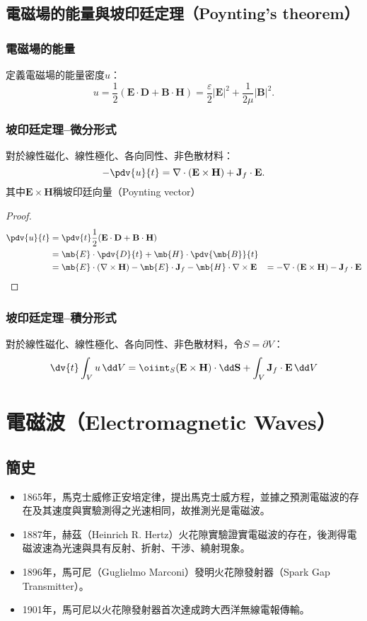 \documentclass[a4paper,12pt]{report}
\begin{document}
\begin{itemize}
\subsection{電磁場的能量與坡印廷定理（Poynting's theorem）}
\subsubsection{電磁場的能量}
定義電磁場的能量密度$u$：
\[u=\frac{1}{2}(\mathbf{E}\cdot\mathbf{D}+\mathbf{B}\cdot\mathbf{H})=\frac{\varepsilon}{2}|\mathbf{E}|^2+\frac{1}{2\mu}|\mathbf{B}|^2.\]
\subsubsection{坡印廷定理–微分形式}
對於線性磁化、線性極化、各向同性、非色散材料：
\[-\pdv{u}{t}=\nabla\cdot(\mathbf{E}\times\mathbf{H})+\mathbf{J}_f\cdot\mathbf{E}.\]
其中$\mathbf{E}\times\mathbf{H}$稱坡印廷向量（Poynting vector）
\begin{proof}
\[\begin{aligned}
\pdv{u}{t}&=\pdv{t}\frac{1}{2}(\mathbf{E}\cdot\mathbf{D}+\mathbf{B}\cdot\mathbf{H})\\
&=\mb{E}\cdot\pdv{D}{t}+\mb{H}\cdot\pdv{\mb{B}}{t}\\
&=\mb{E}\cdot(\nabla\times\mathbf{H})-\mb{E}\cdot\mathbf{J}_f-\mb{H}\cdot\nabla \times \mathbf{E}
&=-\nabla\cdot(\mathbf{E}\times\mathbf{H})-\mathbf{J}_f\cdot\mathbf{E}
\end{aligned}\]
\end{proof}
\subsubsection{坡印廷定理–積分形式}
對於線性磁化、線性極化、各向同性、非色散材料，令$S=\partial V$：
\[\dv{t}\int_Vu\,\dd V=\oiint_S(\mathbf{E}\times\mathbf{H})\cdot\dd\mathbf{S}+\int_V\mathbf{J}_f\cdot\mathbf{E}\,\dd V\]


\section{電磁波（Electromagnetic Waves）}
\subsection{簡史}
\begin{itemize}
\item 1865年，馬克士威修正安培定律，提出馬克士威方程，並據之預測電磁波的存在及其速度與實驗測得之光速相同，故推測光是電磁波。
\item 1887年，赫茲（Heinrich R. Hertz）火花隙實驗證實電磁波的存在，後測得電磁波速為光速與具有反射、折射、干涉、繞射現象。
\item 1896年，馬可尼（Guglielmo Marconi）發明火花隙發射器（Spark Gap Transmitter）。
\item 1901年，馬可尼以火花隙發射器首次達成跨大西洋無線電報傳輸。
\end{itemize}

\end{itemize}
\end{document}
